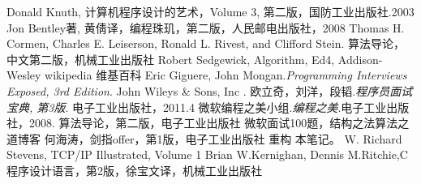 \documentclass[11pt,a4paper]{report}
\begin{document}
\begin{thebibliography}{99}
     Donald Knuth, 计算机程序设计的艺术，Volume 3, 第二版，国防工业出版社.2003
     Jon Bentley著, 黄倩译，编程珠玑，第二版，人民邮电出版社，2008
     Thomas H. Cormen, Charles E. Leiserson, Ronald L. Rivest, and Clifford Stein. 算法导论，中文第二版，机械工业出版社
     Robert Sedgewick, Algorithm, Ed4, Addison-Wesley
    wikipedia 
     维基百科
     Eric Giguere, John Mongan.\emph{Programming Interviews Exposed, 3rd Edition}. John Wileys \& Sons, Inc .
     欧立奇，刘洋，段韬.\emph{程序员面试宝典, 第3版}. 电子工业出版社，2011.4 
     微软编程之美小组.\emph{编程之美}.电子工业出版社，2008.
     算法导论，第二版，电子工业出版社
    微软面试100题，结构之法算法之道博客
    何海涛，剑指offer，第1版，电子工业出版社
    重构
    本笔记。
    W. Richard Stevens, TCP/IP Illustrated, Volume 1
    Brian W.Kernighan, Dennis M.Ritchie,C程序设计语言，第2版，徐宝文译，机械工业出版社

\end{thebibliography}
\end{document}
